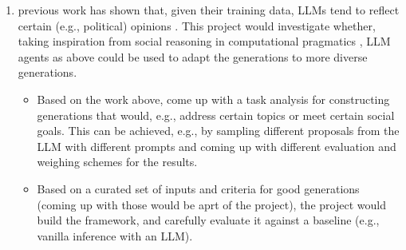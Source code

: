 \documentclass[fleqn,reqno,10pt]{article}
\newcommand{\pt}[1]{\textcolor{CSP-accent-1}{[PT: #1]}}
\begin{document}
\begin{enumerate}
  \item previous work has shown that, given their training data, LLMs tend to reflect certain (e.g., political) opinions \citep{santurkar2023opinionslanguagemodelsreflect}. This project would investigate whether, taking inspiration from social reasoning in computational pragmatics \citep{yoon2020polite}, LLM agents as above could be used to adapt the generations to more diverse generations. %
  \begin{itemize}
    \item Based on the work above, come up with a task analysis for constructing generations that would, e.g., address certain topics or meet certain social goals. This can be achieved, e.g., by sampling different proposals from the LLM with different prompts and coming up with different evaluation and weighing schemes for the results.   %
    \item Based on a curated set of inputs and criteria for good generations (coming up with those would be aprt of the project), the project would build the framework, and carefully evaluate it against a baseline (e.g., vanilla inference with an LLM). 

\end{itemize}
\end{enumerate}
\end{document}
